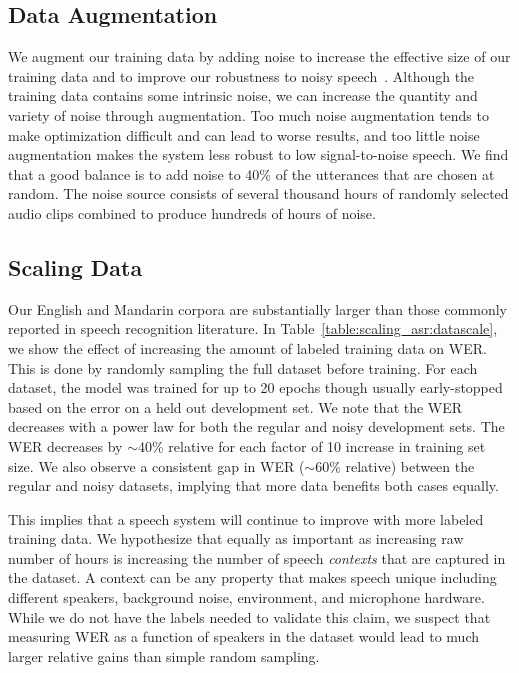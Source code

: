 \subsection{Data Augmentation}

We augment our training data by adding noise to increase the effective size of
our training data and to improve our robustness to noisy
speech~\cite{hannun2014deepspeech}. Although the training data contains some
intrinsic noise, we can increase the quantity and variety of noise through
augmentation. Too much noise augmentation tends to make optimization difficult
and can lead to worse results, and too little noise augmentation makes the
system less robust to low signal-to-noise speech.  We find that a good balance
is to add noise to 40\% of the utterances that are chosen at random. The noise
source consists of several thousand hours of randomly selected audio clips
combined to produce hundreds of hours of noise.

\subsection{Scaling Data}

Our English and Mandarin corpora are substantially larger than those commonly
reported in speech recognition literature. In
Table~\ref{table:scaling_asr:datascale}, we show the effect of increasing the
amount of labeled training data on WER. This is done by randomly sampling the
full dataset before training. For each dataset, the model was trained for up to
20 epochs though usually early-stopped based on the error on a held out
development set. We note that the WER decreases with a power law for both the
regular and noisy development sets. The WER decreases by $\sim$40\% relative
for each factor of 10 increase in training set size. We also observe a
consistent gap in WER ($\sim$60\% relative) between the regular and noisy
datasets, implying that more data benefits both cases equally. 

This implies that a speech system will continue to improve with more labeled
training data. We hypothesize that equally as important as increasing raw
number of hours is increasing the number of speech \emph{contexts} that are
captured in the dataset. A context can be any property that makes speech unique
including different speakers, background noise, environment, and microphone
hardware. While we do not have the labels needed to validate this claim, we
suspect that measuring WER as a function of speakers in the dataset would lead
to much larger relative gains than simple random sampling.

